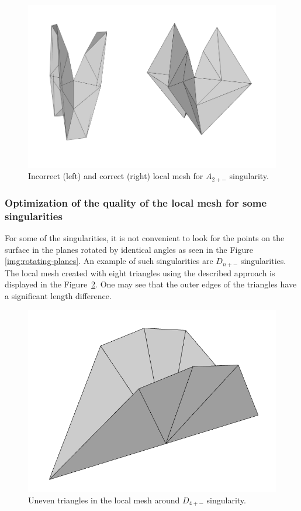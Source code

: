 \begin{figure}
    \centerline{\includegraphics[scale=0.4]{images/img55}}
    \caption[Incorrect and correct local mesh]
    {Incorrect (left) and correct (right) local mesh for $A_{2+-}$ singularity.}
    \label{img:55}
\end{figure}


\subsubsection*{Optimization of the quality of the local mesh for some singularities}
For some of the singularities, it is not convenient to look for the points on
the surface in the planes rotated by identical angles as seen in the Figure
\ref{img:rotating-planes}. An example of such singularities are $D_{n+-}$
singularities. The local mesh created with eight triangles using the described 
approach is displayed in the Figure~\ref{img:D4-before}. One may see that the
outer edges of the triangles have a significant length difference.

\begin{figure}
    \centerline{\includegraphics[scale=0.25]{images/D4-before}}
    \caption[Uneven triangles in the local mesh around $D_{4+-}$ singularity]
    {Uneven triangles in the local mesh around $D_{4+-}$ singularity.}
    \label{img:D4-before}
\end{figure}

